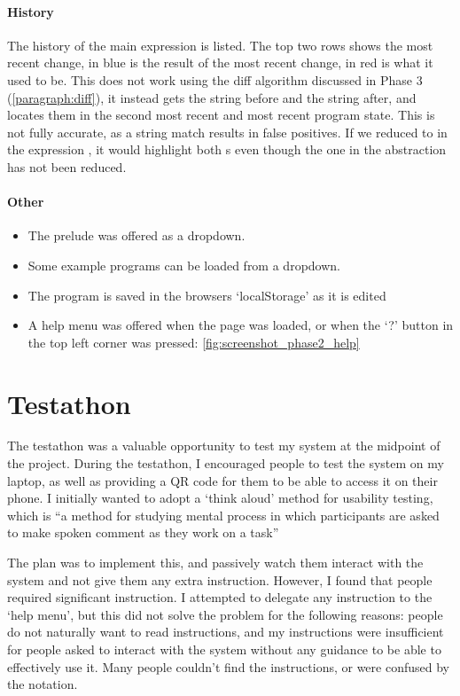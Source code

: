 \paragraph{History}
The history of the main expression is listed. The top two rows shows the most recent change, in blue is the result of the most recent change, in red is what it used to be. This does not work using the diff algorithm discussed in Phase 3 (\ref{paragraph:diff}), it instead gets the string before and the string after, and locates them in the second most recent and most recent program state. This is not fully accurate, as a string match results in false positives. If we reduced  to  in the expression , it would highlight both s even though the one in the abstraction has not been reduced. 

\paragraph{Other}

\begin{itemize}
    \item The prelude was offered as a dropdown.
    \item Some example programs can be loaded from a dropdown.  
    \item The program is saved in the browsers `localStorage' as it is edited
    \item A help menu was offered when the page was loaded, or when the `?' button in the top left corner was pressed: \ref{fig:screenshot_phase2_help}
\end{itemize}

\section{Testathon}
The testathon was a valuable opportunity to test my system at the midpoint of the project. During the testathon, I encouraged people to test the system on my laptop, as well as providing a QR code for them to be able to access it on their phone. I initially wanted to adopt a `think aloud' method for usability testing, which is ``a method for studying mental process in which participants are asked to make spoken comment as they work on a task''\cite{thinkaloud}

The plan was to implement this, and passively watch them interact with the system and not give them any extra instruction. However, I found that people required significant instruction. I attempted to delegate any instruction to the `help menu', but this did not solve the problem for the following reasons: people do not naturally want to read instructions, and my instructions were insufficient for people asked to interact with the system without any guidance to be able to effectively use it. Many people couldn't find the instructions, or were confused by the notation.

